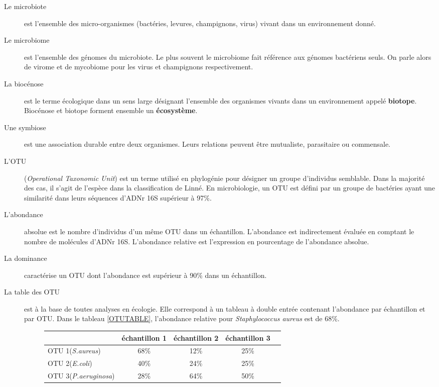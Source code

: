 \documentclass[12pt,a4paper]{article}
\begin{document}
\begin{description}
\item[Le microbiote\cite{Eisen} ]est l’ensemble des micro-organismes (bactéries, levures, champignons, virus) vivant dans un environnement donné.
  
\item[Le microbiome\cite{Eisen}] est l'ensemble des génomes du microbiote. Le plus souvent le microbiome fait référence aux génomes bactériens seuls. On parle alors de virome et de mycobiome pour les virus et champignons respectivement.

\item[La biocénose] est le terme écologique dans un sens large désignant l'ensemble des organismes vivants dans un environnement appelé \textbf{biotope}. Biocénose et biotope forment ensemble un \textbf{écosystème}.

\item[Une symbiose] est une association durable entre deux organismes. Leurs relations peuvent être mutualiste, parasitaire ou commensale.


\item[L'OTU] (\textit{Operational Taxonomic Unit}) est un terme utilisé en phylogénie pour désigner un groupe d’individus semblable. Dans la majorité des cas, il s'agit de l'espèce dans la classification de Linné.
En microbiologie, un OTU est défini par un groupe de bactéries ayant une similarité dans leurs séquences d'ADNr 16S supérieur à 97\%.

\item[L'abondance] absolue est le nombre d'individus d'un même OTU dans un échantillon. L'abondance est indirectement évaluée en comptant le nombre de molécules d'ADNr 16S. 
L’abondance relative est l'expression en pourcentage de l'abondance absolue.

\item[La dominance] caractérise un OTU dont l'abondance est supérieur à 90\% dans un échantillon.


\item[La table des OTU] est à la base de toutes analyses en écologie. Elle correspond à un tableau à double entrée contenant l’abondance par échantillon et par OTU. Dans le tableau \ref{OTUTABLE}, l'abondance relative pour \textit{Staphylococcus aureus} est de 68\%.

\begin{figure}[h]
\begin{center}
\begin{tabular}{|l|c|c|c|c}
  \hline
   & échantillon 1 & échantillon 2 & échantillon 3  \\
  \hline
  OTU 1(\textit{S.aureus}) & 68\% & 12\% & 25\% \\
  OTU 2(\textit{E.coli})& 40\% & 24\% & 25\% \\
  OTU 3(\textit{P.aeruginosa}) & 28\% & 64\% & 50\% \\


\end{tabular}
\end{center}
\end{figure}
\end{description}
\end{document}

